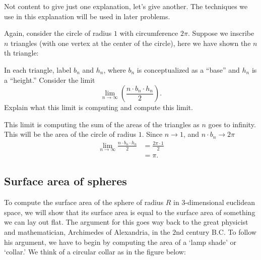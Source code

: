 \documentclass[hints,handout,noauthor,nooutcomes,12pt]{ximera}
\begin{document}
Not content to give just one explanation, let's give another. The
techniques we use in this explanation will be used in later problems.

\begin{problem}
Again, consider the circle of radius $1$ with circumference $2\pi$.
Suppose we inscribe $n$ triangles (with one vertex at the center of
the circle), here we have shown the $n$th triangle:
\begin{image}
\end{image}
In each triangle, label $b_n$ and $h_n$, where $b_n$ is conceptualized
as a ``base'' and $h_n$ is a ``height.''  Consider the limit
\[
\lim_{n\to\infty} \left(\frac{n\cdot b_n\cdot h_n}{2}\right).
\]
Explain what this limit is computing and compute this limit.
\begin{freeResponse}
This limit is computing the sum of the areas of the triangles as $n$
goes to infinity. This will be the area of the circle of radius
$1$. Since $n\to 1$, and $n\cdot b_n\to 2\pi$
\begin{align*}
\lim_{n\to\infty} \frac{n\cdot b_n\cdot h_n}{2} &= \frac{2\pi\cdot 1}{2}\\
&=\pi.
\end{align*}
\end{freeResponse}
\end{problem}


\subsection{Surface area of spheres}

To compute the surface area of the sphere of radius $R$ in $3$-dimensional
euclidean space, we will show that its surface area is equal to the surface
area of something we can lay out flat. The argument for this goes way back to
the great physicist and mathematician, Archimedes of Alexandria, in the $2$nd
century B.C. To follow his argument, we have to begin by computing the area of
a `lamp shade' or `collar.' We think of a circular collar as in the figure
below:
\end{document}
